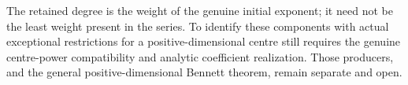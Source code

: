 The retained degree is the weight of the genuine initial exponent; it
need not be the least weight present in the series. To identify these
components with actual exceptional restrictions for a positive-dimensional
centre still requires the genuine centre-power compatibility and
analytic coefficient realization. Those producers, and the general
positive-dimensional Bennett theorem, remain separate and open.
